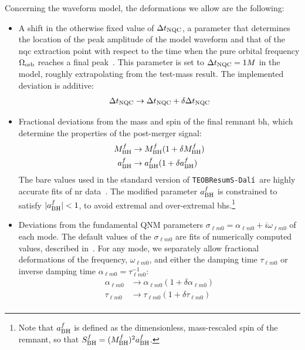 \documentclass[prd,amssymb,amsmath,amsfonts,nofootinbib,reprint,showpacs,longbibliography]{revtex4-1}
\def\mbhf{M_{\rm BH}^f}
\def\abhf{a_{\rm BH}^f}
\def\alphalm0{\alpha_{\ell m 0}}
\def\taulm0{\tau_{\ell m 0}}
\def\omegalm0{\omega_{\ell m 0}}
\newcommand{\dali}[0]{\texttt{TEOBResumS-Dalí}}
\begin{document}
Concerning the waveform model, the deformations we allow are the following:
\begin{itemize}
    \item A shift in the otherwise fixed value of $\Delta t_{\rm NQC}$, a parameter that determines the location
    of the peak amplitude of the model waveform and that of the \ac{nqc} extraction point with respect to the
    time when the pure orbital frequency $\Omega_{\rm orb}$ reaches a final peak~\cite{Damour:2014sva,Nagar:2024oyk}.
    This parameter is set to $\Delta t_{\rm NQC} = 1M$ in the model, roughly extrapolating from the test-mass result.
    The implemented deviation is additive:
    \begin{equation}
    \Delta t_{\rm NQC} \rightarrow \Delta t_{\rm NQC} + \delta \Delta t_{\rm NQC}
    \end{equation}
    \item Fractional deviations from the mass and spin of the final remnant \ac{bh}, which determine the properties
    of the post-merger signal:
    \begin{subequations}
    \begin{align}
    \mbhf &\rightarrow \mbhf (1 + \delta \mbhf) \\
    \abhf &\rightarrow \abhf (1 + \delta \abhf)
    \end{align}
    \end{subequations}
    The bare values used in the standard version of \dali~are highly accurate fits of \ac{nr}
    data~\cite{Jimenez-Forteza:2016oae}. The modified parameter $\abhf$ is constrained to satisfy
    $|\abhf| < 1$, to avoid extremal and over-extremal \acp{bh}.\footnote{Note that $\abhf$ is defined
    as the dimensionless, mass-rescaled spin of the remnant, so that $S_{\rm BH}^{f} = (\mbhf)^2 \abhf$.}
%
\item Deviations from the fundamental QNM parameters $\sigma_{\ell m 0} = \alphalm0 + i \omegalm0$ of each
mode. The default values of the $\sigma_{\ell m 0}$ are fits of numerically computed values,
described in~\cite{Nagar:2019wds}. For any mode, we separately allow fractional deformations of the frequency,
$\omegalm0$, and either the damping time $\taulm0$ or inverse damping time $\alphalm0 = \taulm0^{-1}$:
\begin{subequations}
\begin{align}
\alphalm0 &\rightarrow \alphalm0 (1 + \delta \alphalm0) \\
\taulm0   &\rightarrow \taulm0   (1 + \delta \taulm0) \\

\end{align}
\end{subequations}
\end{itemize}
\end{document}
